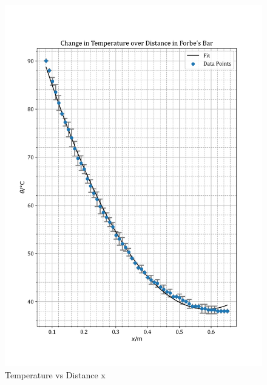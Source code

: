 \documentclass[12pt, a4paper]{article}
\begin{document}
\begin{figure}
    \centering
    \includegraphics[width=\textwidth]{ThetavsXPlot.png}
    \caption{Temperature vs Distance x}
    \label{fig:Temperature vs X}
\end{figure}
\end{document}
